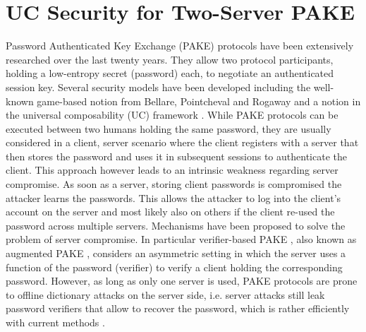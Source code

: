 \section{UC Security for Two-Server PAKE}
Password Authenticated Key Exchange (PAKE) protocols have been extensively researched over the last twenty years.
They allow two protocol participants, holding a low-entropy secret (password) each, to negotiate an authenticated session key.
Several security models have been developed including the well-known game-based notion from Bellare, Pointcheval and Rogaway \cite{Bellare2000,Abdalla2005a} and a notion in the universal composability (UC) framework \cite{Canetti2005}.
While PAKE protocols can be executed between two humans holding the same password, they are usually considered in a client, server scenario where the client registers with a server that then stores the password and uses it in subsequent sessions to authenticate the client.
This approach however leads to an intrinsic weakness regarding server compromise.
As soon as a server, storing client passwords is compromised the attacker learns the passwords.
This allows the attacker to log into the client's account on the server and most likely also on others if the client re-used the password across multiple servers.
Mechanisms have been proposed to solve the problem of server compromise.
In particular verifier-based PAKE \cite{Gentry2006,rfc2945,BenhamoudaP13}, also known as augmented PAKE \cite{BellovinM93}, considers an asymmetric setting in which the server uses a function of the password (verifier) to verify a client holding the corresponding password.
However, as long as only one server is used, PAKE protocols are prone to offline dictionary attacks on the server side, i.e. server attacks still leak password verifiers that allow to recover the password, which is rather efficiently with current methods \cite{hashcat,johntheripper}.

